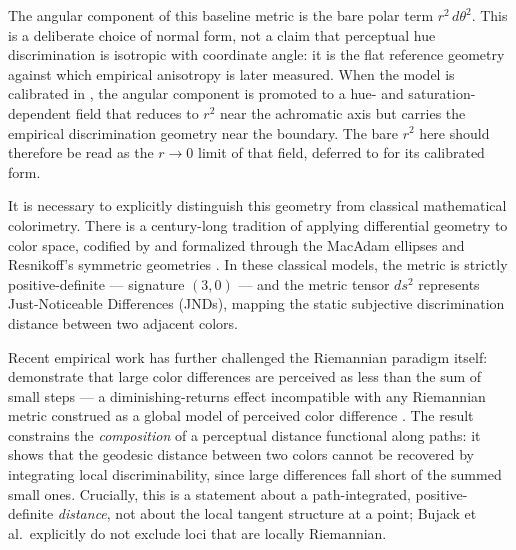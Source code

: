 \documentclass[preprint,12pt,authoryear]{elsarticle}
\theoremstyle{plain}
\theoremstyle{definition}
\theoremstyle{remark}
\begin{document}
The angular component of this baseline metric is the bare polar term $r^2\,d\theta^2$. This is a deliberate choice of normal form, not a claim that perceptual hue discrimination is isotropic with coordinate angle: it is the flat reference geometry against which empirical anisotropy is later measured. When the model is calibrated in , the angular component is promoted to a hue- and saturation-dependent field that reduces to $r^2$ near the achromatic axis but carries the empirical discrimination geometry near the boundary. The bare $r^2$ here should therefore be read as the $r\to 0$ limit of that field, deferred to  for its calibrated form.

It is necessary to explicitly distinguish this geometry from classical mathematical colorimetry. There is a century-long tradition of applying differential geometry to color space, codified by \citet{Schrodinger1920} and formalized through the MacAdam ellipses \citep{MacAdam1942} and Resnikoff's symmetric geometries \citep{Resnikoff1974}. In these classical models, the metric is strictly positive-definite --- signature $(3,0)$ --- and the metric tensor $ds^2$ represents Just-Noticeable Differences (JNDs), mapping the static subjective discrimination distance between two adjacent colors.

Recent empirical work has further challenged the Riemannian paradigm itself: \citeauthor{Bujack2022} demonstrate that large color differences are perceived as less than the sum of small steps --- a diminishing-returns effect incompatible with any Riemannian metric construed as a global model of perceived color difference \citep{Bujack2022}. The result constrains the \emph{composition} of a perceptual distance functional along paths: it shows that the geodesic distance between two colors cannot be recovered by integrating local discriminability, since large differences fall short of the summed small ones. Crucially, this is a statement about a path-integrated, positive-definite \emph{distance}, not about the local tangent structure at a point; Bujack et al.\ explicitly do not exclude loci that are locally Riemannian.
\end{document}
